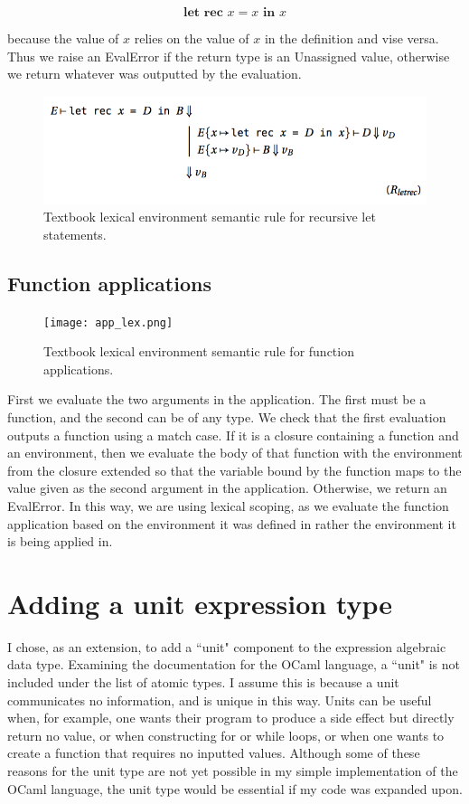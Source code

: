 \documentclass{article}
\begin{document}
$$ \textbf{let rec  } x = x \textbf{ in } x $$

because the value of $x$ relies on the value of $x$ in the definition and vise versa. Thus we raise an EvalError if the return type is an Unassigned value, otherwise we return whatever was outputted by the evaluation.

\begin{figure}[h]
\begin{center}
\includegraphics[width=.7\textwidth]{letrec_lex.png}
\end{center}
\caption{Textbook lexical environment semantic rule for recursive let statements.}
\end{figure}



\subsection{Function applications}

\begin{figure}[h]
\begin{center}
\texttt{[image: app\_lex.png]}
\end{center}
\caption{Textbook lexical environment semantic rule for function applications.}
\end{figure}

First we evaluate the two arguments in the application. The first must be a function, and the second can be of any type. We check that the first evaluation outputs a function using a match case. If it is a closure containing a function and an environment, then we evaluate the body of that function with the environment from the closure extended so that the variable bound by the function maps to the value given as the second argument in the application. Otherwise, we return an EvalError. In this way, we are using lexical scoping, as we evaluate the function application based on the environment it was defined in rather the environment it is being applied in. 


\section{Adding a unit expression type}
I chose, as an extension, to add a ``unit" component to the expression algebraic data type. Examining the documentation for the OCaml language, a ``unit" is not included under the list of atomic types. I assume this is because a unit communicates no information, and is unique in this way. Units can be useful when, for example, one wants their program to produce a side effect but directly return no value, or when constructing for or while loops, or when one wants to create a function that requires no inputted values. Although some of these reasons for the unit type are not yet possible in my simple implementation of the OCaml language, the unit type would be essential if my code was expanded upon.
\end{document}
